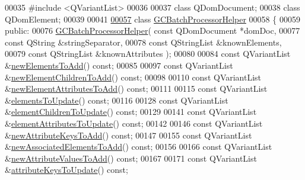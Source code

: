 \begin{DoxyCode}
00035 \textcolor{preprocessor}{#include <QVariantList>}
00036 
00037 \textcolor{keyword}{class }QDomDocument;
00038 \textcolor{keyword}{class }QDomElement;
00039 
00041 
\hypertarget{gcbatchprocessorhelper_8h_source_l00057}{}\hyperlink{class_g_c_batch_processor_helper}{00057} \textcolor{keyword}{class }\hyperlink{class_g_c_batch_processor_helper}{GCBatchProcessorHelper}
00058 \{
00059 \textcolor{keyword}{public}:
00076   \hyperlink{class_g_c_batch_processor_helper_a36b76739cc2d64ab72e9d9b68425a7f1}{GCBatchProcessorHelper}( \textcolor{keyword}{const} QDomDocument *domDoc,
00077                           \textcolor{keyword}{const} QString &stringSeparator,
00078                           \textcolor{keyword}{const} QStringList &knownElements,
00079                           \textcolor{keyword}{const} QStringList &knownAttributes );
00080 
00084   \textcolor{keyword}{const} QVariantList &\hyperlink{class_g_c_batch_processor_helper_afdedbc674698c019ebd2a3938a239661}{newElementsToAdd}() \textcolor{keyword}{const};
00085 
00097   \textcolor{keyword}{const} QVariantList &\hyperlink{class_g_c_batch_processor_helper_a89c14c3740c7cb57c937ef8db99b4af1}{newElementChildrenToAdd}() \textcolor{keyword}{const};
00098 
00110   \textcolor{keyword}{const} QVariantList &\hyperlink{class_g_c_batch_processor_helper_a640ca9bd78b7da0796fdfb82fefce8b6}{newElementAttributesToAdd}() \textcolor{keyword}{const};
00111 
00115   \textcolor{keyword}{const} QVariantList &\hyperlink{class_g_c_batch_processor_helper_aca0a2d6bbfcb23907e917b5d2251fc6f}{elementsToUpdate}() \textcolor{keyword}{const};
00116 
00128   \textcolor{keyword}{const} QVariantList &\hyperlink{class_g_c_batch_processor_helper_a8fd4cac8af9a54df52a98628d5ba6fbe}{elementChildrenToUpdate}() \textcolor{keyword}{const};
00129 
00141   \textcolor{keyword}{const} QVariantList &\hyperlink{class_g_c_batch_processor_helper_a3b0630e9e210b2b86e58cb43d3706b73}{elementAttributesToUpdate}() \textcolor{keyword}{const};
00142 
00146   \textcolor{keyword}{const} QVariantList &\hyperlink{class_g_c_batch_processor_helper_a605ca53123f28467df39cabeb3aa65cd}{newAttributeKeysToAdd}() \textcolor{keyword}{const};
00147 
00155   \textcolor{keyword}{const} QVariantList &\hyperlink{class_g_c_batch_processor_helper_abf195046fd00e629b2ce5e3bd6bcf90d}{newAssociatedElementsToAdd}() \textcolor{keyword}{const};
00156 
00166   \textcolor{keyword}{const} QVariantList &\hyperlink{class_g_c_batch_processor_helper_af06d87d433f9402667f1cd654ad4b422}{newAttributeValuesToAdd}() \textcolor{keyword}{const};
00167 
00171   \textcolor{keyword}{const} QVariantList &\hyperlink{class_g_c_batch_processor_helper_a4cad81bffaa5af1531a72ccaeaedd600}{attributeKeysToUpdate}() \textcolor{keyword}{const};

\end{DoxyCode}
